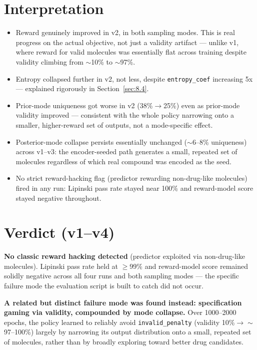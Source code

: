 \documentclass[11pt]{article}
\newcommand{\code}[1]{\texttt{#1}}
\begin{document}
\section{Interpretation}

\begin{itemize}
  \item Reward genuinely improved in v2, in both sampling modes. This is real progress on the actual objective, not just a validity artifact --- unlike v1, where reward for valid molecules was essentially flat across training despite validity climbing from $\sim$10\% to $\sim$97\%.
  \item Entropy collapsed further in v2, not less, despite \code{entropy\_coef} increasing 5x --- explained rigorously in Section~\ref{sec:8.4}.
  \item Prior-mode uniqueness got worse in v2 (38\%$\to$25\%) even as prior-mode validity improved --- consistent with the whole policy narrowing onto a smaller, higher-reward set of outputs, not a mode-specific effect.
  \item Posterior-mode collapse persists essentially unchanged ($\sim$6--8\% uniqueness) across v1--v3: the encoder-seeded path generates a small, repeated set of molecules regardless of which real compound was encoded as the seed.
  \item No strict reward-hacking flag (predictor rewarding non-drug-like molecules) fired in any run: Lipinski pass rate stayed near 100\% and reward-model score stayed negative throughout.
\end{itemize}

\section{Verdict (v1--v4)}
\label{sec:verdict1}

\textbf{No classic reward hacking detected} (predictor exploited via non-drug-like molecules). Lipinski pass rate held at $\geq$99\% and reward-model score remained solidly negative across all four runs and both sampling modes --- the specific failure mode the evaluation script is built to catch did not occur.

\textbf{A related but distinct failure mode was found instead: specification gaming via validity, compounded by mode collapse.} Over 1000--2000 epochs, the policy learned to reliably avoid \code{invalid\_penalty} (validity 10\%$\to\sim$97--100\%) largely by narrowing its output distribution onto a small, repeated set of molecules, rather than by broadly exploring toward better drug candidates.
\end{document}

